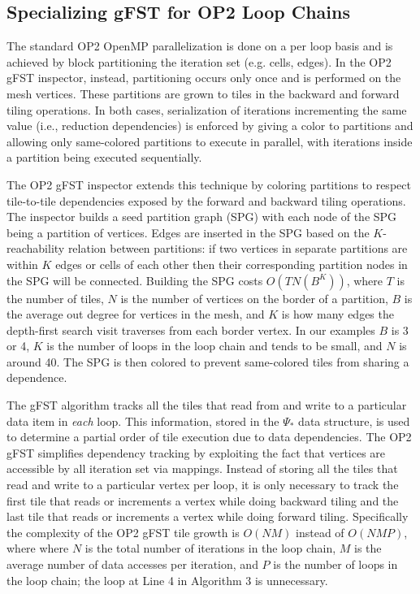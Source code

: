 \subsection{Specializing gFST for OP2 Loop Chains}
\label{sec:OP2gFSTalg}

The standard OP2 OpenMP parallelization is done on a per loop basis
and is achieved by block partitioning the iteration set (e.g. cells, edges). In the OP2 gFST inspector, instead, partitioning occurs only once and is performed on the mesh vertices. These partitions are 
grown to tiles in the backward and forward tiling operations. In both cases, 
serialization of iterations incrementing the same 
value (i.e., reduction dependencies) is enforced by giving a color to 
partitions and allowing only same-colored partitions to execute in 
parallel, with iterations inside a partition being executed sequentially. 

The OP2 gFST inspector extends this technique by coloring partitions 
to respect tile-to-tile dependencies exposed  by the forward and backward tiling operations. 
The inspector builds a seed partition graph (SPG) with each 
node of the SPG being a partition of vertices. 
Edges are inserted in the SPG
based on the $K$-reachability relation between partitions: if two vertices in
separate partitions are within $K$ edges or cells of each other then 
their corresponding partition nodes in the SPG will be connected. 
Building the SPG costs $O(TN(B^K))$, where $T$ is the number of tiles, $N$ 
is the number of vertices on the border of a partition, 
$B$ is the average out degree for vertices in the mesh, and $K$ is how
many edges the depth-first search visit traverses from each border vertex.
In our examples $B$ is 3 or 4, $K$ is the number of loops in the loop chain and tends
to be small, and $N$ is around 40.
The SPG is then 
colored %
to prevent same-colored tiles
from sharing a dependence. 

The gFST algorithm tracks all the tiles that read from and 
write to a particular data item in \emph{each} loop. This information, stored in the 
$\Psi_*$ data structure, is used to determine a partial order of tile execution 
due to data dependencies. %
The OP2 gFST simplifies dependency tracking by exploiting the fact that vertices are accessible 
by all iteration set via mappings. 
Instead of storing all the tiles that read
and write to a particular vertex per loop, it is only necessary to track the first
tile that reads or increments a vertex while doing backward tiling and the last tile that
reads or increments a vertex while doing forward tiling.
Specifically the complexity of the OP2 gFST tile growth
is $O(NM)$ instead of $O(NMP)$, where 
where $N$ is the total 
number of iterations in the loop chain,
$M$ is the average number of data accesses per iteration, and
$P$ is the number
of loops in the loop chain; the loop at Line 4 in Algorithm 3 is unnecessary.


